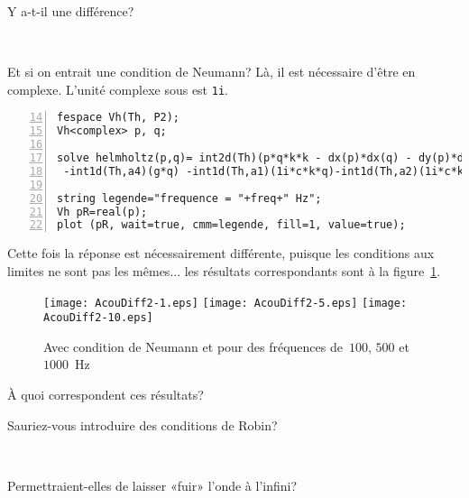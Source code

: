 \medskip
Y a-t-il une différence?
\begin{flushright}
\\
\end{flushright}

\medskip
Et si on entrait une condition de Neumann? Là, il est nécessaire d'être en complexe. L'unité complexe sous \freefem est \verb|1i|.
\scriptsize
\begin{Verbatim}[numbers=left,numbersep=3pt,firstnumber=14]
fespace Vh(Th, P2);
Vh<complex> p, q;

solve helmholtz(p,q)= int2d(Th)(p*q*k*k - dx(p)*dx(q) - dy(p)*dy(q))
 -int1d(Th,a4)(g*q) -int1d(Th,a1)(1i*c*k*q)-int1d(Th,a2)(1i*c*k*q)-int1d(Th,a3)(1i*c*k*q);

string legende="frequence = "+freq+" Hz";
Vh pR=real(p);
plot (pR, wait=true, cmm=legende, fill=1, value=true);
\end{Verbatim}
\normalsize

\medskip
Cette fois la réponse est nécessairement différente, puisque les conditions aux limites ne sont pas les mêmes... les résultats correspondants sont à la figure~\ref{Fig-AcouDiff2}.
\begin{figure}[h!]
\centering
   \texttt{[image: AcouDiff2-1.eps]}\hfill
   \texttt{[image: AcouDiff2-5.eps]}\hfill
   \texttt{[image: AcouDiff2-10.eps]}
\caption{Avec condition de Neumann et pour des fréquences de~$100$, $500$ et $1000$~Hz}\label{Fig-AcouDiff2}
\end{figure}

\medskip
À quoi correspondent ces résultats?
\begin{flushright}
\end{flushright}

Sauriez-vous introduire des conditions de Robin?
\begin{flushright}
\\
\end{flushright}

Permettraient-elles de laisser «fuir» l'onde à l'infini?
\begin{flushright}
\\
\end{flushright}

